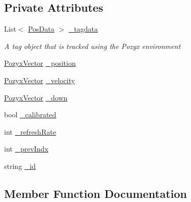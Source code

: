 \subsection*{Private Attributes}
\begin{DoxyCompactItemize}
\item 
List$<$ \hyperlink{struct_pozyx_subscriber_1_1_framework_1_1_pos_data}{Pos\+Data} $>$ \hyperlink{class_pozyx_subscriber_1_1_framework_1_1_tag_a8e3301483ad33c81388eacda51e39f3b}{\+\_\+tagdata}
\begin{DoxyCompactList}\small\item\em A tag object that is tracked using the Pozyx environment \end{DoxyCompactList}\item 
\hyperlink{struct_pozyx_subscriber_1_1_framework_1_1_pozyx_vector}{Pozyx\+Vector} \hyperlink{class_pozyx_subscriber_1_1_framework_1_1_tag_ae4d79a68e001e62340cc5f6184f46f82}{\+\_\+position}
\item 
\hyperlink{struct_pozyx_subscriber_1_1_framework_1_1_pozyx_vector}{Pozyx\+Vector} \hyperlink{class_pozyx_subscriber_1_1_framework_1_1_tag_a56ff41dd3c5a612ab390ef2d6c2eacdb}{\+\_\+velocity}
\item 
\hyperlink{struct_pozyx_subscriber_1_1_framework_1_1_pozyx_vector}{Pozyx\+Vector} \hyperlink{class_pozyx_subscriber_1_1_framework_1_1_tag_a8524031ef74735540ef02c6a144eac01}{\+\_\+down}
\item 
bool \hyperlink{class_pozyx_subscriber_1_1_framework_1_1_tag_a3239688e001844a24284b8add4bda133}{\+\_\+calibrated}
\item 
int \hyperlink{class_pozyx_subscriber_1_1_framework_1_1_tag_acd3b551104408fd60eea0a868e1fafe2}{\+\_\+refresh\+Rate}
\item 
int \hyperlink{class_pozyx_subscriber_1_1_framework_1_1_tag_a10e9b6ccc424f24caeb65a05a268d10a}{\+\_\+prev\+Indx}
\item 
string \hyperlink{class_pozyx_subscriber_1_1_framework_1_1_tag_a0971d6d25e87cc52ca66e956a67ca583}{\+\_\+id}
\end{DoxyCompactItemize}


\subsection{Member Function Documentation}
\mbox{\label{class_pozyx_subscriber_1_1_framework_1_1_tag_a3d46f90b9f7f701bda3a25639c31d392}} 
